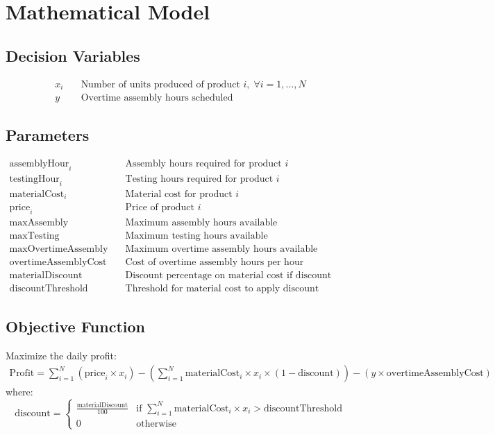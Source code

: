 \documentclass{article}
\begin{document}
\section*{Mathematical Model}

\subsection*{Decision Variables}
\begin{align*}
x_i & \quad \text{Number of units produced of product } i, \; \forall i = 1, \ldots, N \\
y & \quad \text{Overtime assembly hours scheduled}
\end{align*}

\subsection*{Parameters}
\begin{align*}
\text{assemblyHour}_i & \quad \text{Assembly hours required for product } i \\
\text{testingHour}_i & \quad \text{Testing hours required for product } i \\
\text{materialCost}_i & \quad \text{Material cost for product } i \\
\text{price}_i & \quad \text{Price of product } i \\
\text{maxAssembly} & \quad \text{Maximum assembly hours available} \\
\text{maxTesting} & \quad \text{Maximum testing hours available} \\
\text{maxOvertimeAssembly} & \quad \text{Maximum overtime assembly hours available} \\
\text{overtimeAssemblyCost} & \quad \text{Cost of overtime assembly hours per hour} \\
\text{materialDiscount} & \quad \text{Discount percentage on material cost if discount threshold met} \\
\text{discountThreshold} & \quad \text{Threshold for material cost to apply discount}
\end{align*}

\subsection*{Objective Function}
Maximize the daily profit:
\begin{align*}
\text{Profit} = \sum_{i=1}^{N} \left(\text{price}_i \times x_i\right) - \left(\sum_{i=1}^{N} \text{materialCost}_i \times x_i \times (1 - \text{discount})\right) - \left(y \times \text{overtimeAssemblyCost}\right)
\end{align*}
where:
\[
\text{discount} = 
\begin{cases} 
\frac{\text{materialDiscount}}{100} & \text{if } \sum_{i=1}^{N} \text{materialCost}_i \times x_i > \text{discountThreshold} \\
0 & \text{otherwise}
\end{cases}
\]
\end{document}
